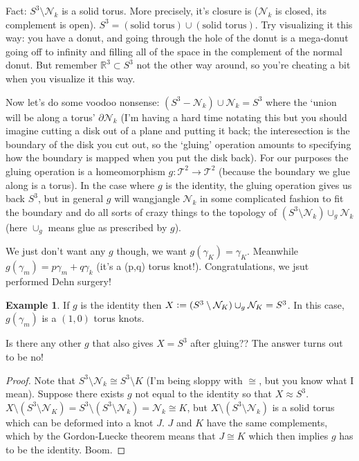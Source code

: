 \documentclass[11pt]{article}
\newcommand{\R}{\mathbb{R}}
\newcommand{\T}{\mathcal{T}}
\newcommand{\NN}{\mathcal{N}}
\newcommand{\defeq}{\vcentcolon=}
\theoremstyle{plain}
\theoremstyle{definition}
\newtheorem{ex}{Example}
\begin{document}
Fact: $S^3 \setminus \NN_k$ is a solid torus. More precisely, it's closure is ($\NN_k$ is closed, its complement is open). $S^3 = (\text{solid torus}) \cup (\text{solid torus})$. Try visualizing it this way: you have
a donut, and going through the hole of the donut is a mega-donut going off to infinity and filling all of the space in the complement of the normal donut. But remember $\R^3 \subset S^3$ not the other way around, so you're cheating
a bit when you visualize it this way.

Now let's do some voodoo nonsense: $(S^3 - \NN_k) \cup \NN_k = S^3$ where the `union will be along a torus' $\partial \NN_k$ (I'm having a hard time notating this but you should imagine cutting a disk out of a plane
and putting it back; the interesection is the boundary of the disk you cut out, so the `gluing' operation amounts to specifying how the boundary is mapped when you put the disk back). For our purposes the gluing
operation is a homeomorphism $g: \T^2 \to \T^2$ (because the boundary we glue along is a torus). In the case where $g$ is the identity, the gluing operation gives us back $S^3$, but in general $g$ will wangjangle
$\NN_k$ in some complicated fashion to fit the boundary and do all sorts of crazy things to the topology of $(S^3 \setminus \NN_k) \cup_g \NN_k$ (here $\cup_g$ means glue as prescribed by $g$).

We just don't want any $g$ though, we want $g(\gamma_K) = \gamma_K$. Meanwhile $g(\gamma_m) = p \gamma_m + q \gamma_k$ (it's a (p,q) torus knot!). Congratulations, we jsut performed Dehn surgery!


\begin{ex}
If $g$ is the identity then $X \defeq (S^3 \setminus \NN_K) \cup_g \NN_K = S^3$. In this case, $g(\gamma_m)$ is a $(1, 0)$ torus knots.
\end{ex}

Is there any other $g$ that also gives $X = S^3$ after gluing?? The answer turns out to be no!


\begin{proof}
Note that $S^3 \setminus \NN_k \cong S^3 \setminus K$ (I'm being sloppy with $\cong$, but you know what I  mean). Suppose there exists $g$ not equal to the identity so that $X \approx S^3$.
$X \setminus (S^3 \setminus \NN_K) = S^3 \setminus (S^3 \setminus \NN_k) = \NN_k \cong K$, but $X \setminus (S^3 \setminus  \NN_k)$ is a solid torus which can be deformed into a knot $J$.
$J$ and $K$ have the same complements, which by the Gordon-Luecke theorem means that $J \cong K$ which then implies $g$ has to be the identity. Boom.
\end{proof}
\end{document}
